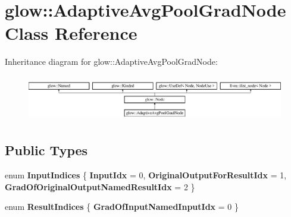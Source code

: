 \hypertarget{classglow_1_1_adaptive_avg_pool_grad_node}{}\section{glow\+:\+:Adaptive\+Avg\+Pool\+Grad\+Node Class Reference}
\label{classglow_1_1_adaptive_avg_pool_grad_node}
Inheritance diagram for glow\+:\+:Adaptive\+Avg\+Pool\+Grad\+Node\+:\begin{figure}[H]
\begin{center}
\leavevmode
\includegraphics[height=2.019231cm]{classglow_1_1_adaptive_avg_pool_grad_node}
\end{center}
\end{figure}
\subsection*{Public Types}
\begin{DoxyCompactItemize}
\item 
\mbox{\label{classglow_1_1_adaptive_avg_pool_grad_node_a5fc581d33221a8839ee8a4f4983800f3}} 
enum {\bfseries Input\+Indices} \{ {\bfseries Input\+Idx} = 0, 
{\bfseries Original\+Output\+For\+Result\+Idx} = 1, 
{\bfseries Grad\+Of\+Original\+Output\+Named\+Result\+Idx} = 2
 \}
\item 
\mbox{\label{classglow_1_1_adaptive_avg_pool_grad_node_a4e6a8a70d4e2f2d2750484ff8f286e1c}} 
enum {\bfseries Result\+Indices} \{ {\bfseries Grad\+Of\+Input\+Named\+Input\+Idx} = 0
 \}
\end{DoxyCompactItemize}
